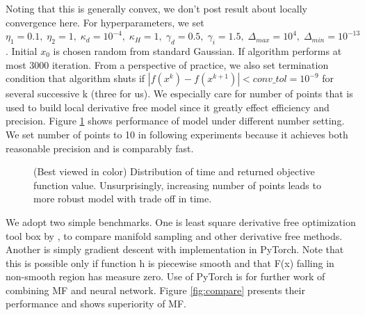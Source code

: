 \documentclass[10pt, oneside]{article}
\begin{document}
Noting that this is generally convex, we don't post result about locally convergence here. For hyperparameters, we set $\eta_1=0.1,\;\eta_2=1,\;\kappa_d=10^{-4},\;\kappa_H=1,\;\gamma_d=0.5,\;\gamma_i=1.5,\;\Delta_{max}=10^4,\;\Delta_{min}=10^{-13}$. Initial $x_0$ is chosen random from standard Gaussian. If algorithm performs at most 3000 iteration. From a perspective of practice, we also set termination condition that algorithm shuts if $\left|f(x^k)-f(x^{k+1})\right|<conv\_tol=10^{-9}$ for several successive k (three for us). We especially care for number of points that is used to build local derivative free model since it greatly effect efficiency and precision. Figure \ref{fig:npt} shows performance of model under different number setting. We set number of points to 10 in following experiments because it achieves both reasonable precision and is comparably fast. 

\begin{figure}[H]
\centering

   \caption{(Best viewed in color) Distribution of time and returned objective function value. Unsurprisingly, increasing number of points leads to more robust model with trade off in time. }
   \label{fig:npt}
  \end{figure}

We adopt two simple benchmarks. One is least square derivative free optimization tool box by \cite{dfols}, to compare manifold sampling and other derivative free methods. Another is simply gradient descent with implementation in PyTorch. Note that this is possible only if function h is piecewise smooth and that F(x) falling in non-smooth region has measure zero. Use of PyTorch is for further work of combining MF and neural network. Figure \ref{fig:compare} presents their performance and shows superiority of MF. 
\end{document}
